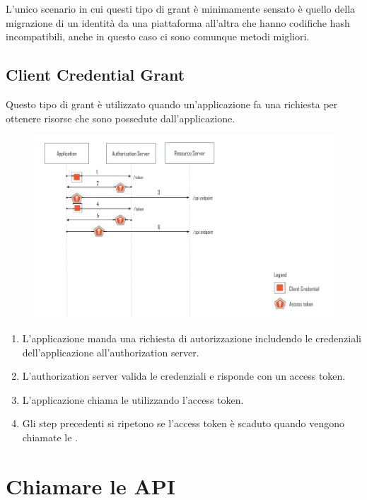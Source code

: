 L'unico scenario in cui questi tipo di grant è minimamente sensato è quello della
migrazione di un identità da una piattaforma all'altra che hanno codifiche hash
incompatibili, anche in questo caso ci sono comunque metodi migliori.

\subsection{Client Credential Grant}

Questo tipo di grant è utilizzato quando un'applicazione fa una richiesta \api{} per
ottenere risorse che sono possedute dall'applicazione.

\begin{figure}[H]
      \centering
      \includegraphics[width=\textwidth, keepaspectratio]{capitoli/id_managing/imgs/clientgrant.png}
\end{figure}

\begin{enumerate}
      \item L'applicazione manda una richiesta di autorizzazione includendo le credenziali
            dell'applicazione all'authorization server.
      \item L'authorization server valida le credenziali e risponde con un access token.
      \item L'applicazione chiama le \api{} utilizzando l'access token.
      \item Gli step precedenti si ripetono se l'access token è scaduto quando vengono chiamate
            le \api{}.
\end{enumerate}

\section{Chiamare le API}

